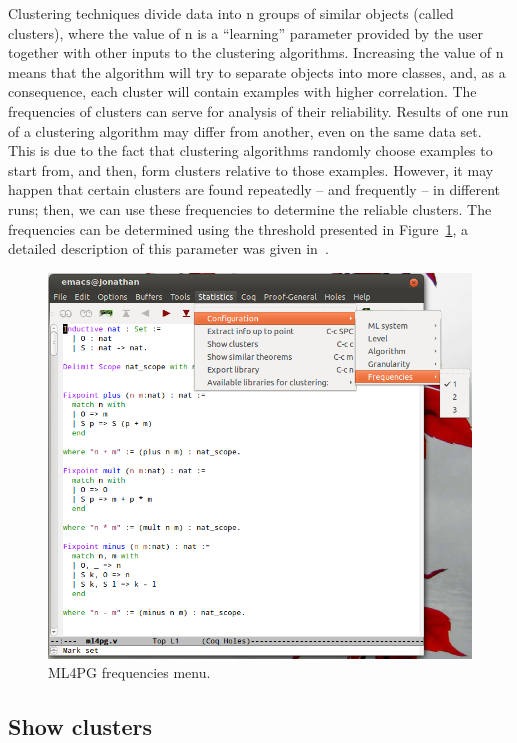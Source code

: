 \documentclass[10pt]{article}
\begin{document}
Clustering techniques divide data into n groups of similar objects (called clusters), where the value of
n is a ``learning'' parameter provided by the user together with other inputs to the clustering algorithms.
Increasing the value of n means that the algorithm will try to separate objects into more classes, and, as a
consequence, each cluster will contain examples with higher correlation. The frequencies of clusters can
serve for analysis of their reliability. Results of one run of a clustering algorithm may differ from another,
even on the same data set. This is due to the fact that clustering algorithms randomly choose examples
to start from, and then, form clusters relative to those examples. However, it may happen that certain
clusters are found repeatedly – and frequently – in different runs; then, we can use these frequencies to
determine the reliable clusters. The frequencies can be determined using the threshold presented in Figure~\ref{frequencies},
a detailed description of this parameter was given in~\cite{KHG12}.


\begin{figure}
 \centering
 \includegraphics[scale=0.4]{images/frequencies.png}
 \caption{ML4PG frequencies menu.}\label{frequencies}
\end{figure}


\subsection{Show clusters}
\end{document}
